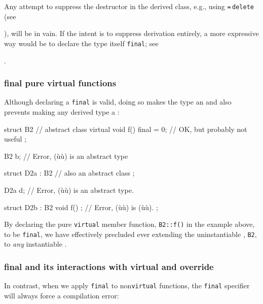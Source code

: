 \noindent Any attempt to suppress the destructor in the derived class, e.g., using
\lstinline!=!\,\lstinline!delete! (see {), will
be in vain. If the intent is to suppress derivation entirely, a more
expressive way would be to declare the type itself \lstinline!final!; see
{.

\subsubsection[\lstinline!final! pure virtual functions]{{\SubsubsecCode final} pure virtual functions}\label{final-pure-virtual-functions}

Although declaring a  \lstinline!final! is
valid, doing so makes the type an  and also
prevents making any derived type a :

\begin{emcppslisting}[emcppsbatch=e1]
struct B2  // abstract class
{
    virtual void f() final = 0;  // OK, but probably not useful
};

B2 b;  // Error, (ù{}ù) is an abstract type

struct D2a : B2  // also an abstract class
{
};

D2a d;  // Error, (ù{}ù) is an abstract type.

struct D2b : B2
{
    void f() {};  // Error, (ù{}ù) is (ù{}ù).
};
\end{emcppslisting}
    

\noindent By declaring the pure \lstinline!virtual! member function, \lstinline!B2::f()!
in the example above, to be \lstinline!final!, we have effectively
precluded ever extending the uninstantiable ,
\lstinline!B2!, to \emph{any} instantiable .

\subsubsection[\lstinline!final! and its interactions with \lstinline!virtual! and \lstinline!override!]{{\SubsubsecCode final} and its interactions with {\SubsubsecCode virtual} and {\SubsubsecCode override}}\label{final-and-its-interactions-with-virtual-and-override}

In contrast, when we apply \lstinline!final! to non\lstinline!virtual!
functions, the \lstinline!final! specifier will always force a compilation
error:

}}

